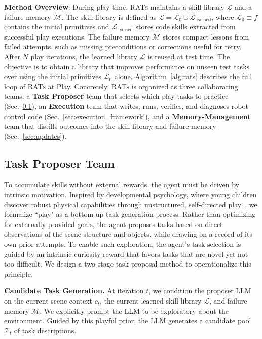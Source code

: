 \documentclass{llmxive}
\begin{document}
\textbf{Method Overview}: During play-time, \textsc{RATs} maintains a skill library $\mathcal{L}$ and a failure memory $\mathcal{M}$. The skill library is defined as
$\mathcal{L} = \mathcal{L}_0 \cup \mathcal{L}_{\text{learned}}$, where $\mathcal{L}_0 \equiv f$ contains the initial primitives and $\mathcal{L}_{\text{learned}}$ stores code skills extracted from successful play executions. The failure memory $\mathcal{M}$ stores compact lessons from failed attempts, such as missing preconditions or corrections useful for retry.
After $N$ play iterations, the learned library $\mathcal{L}$ is reused at test time. The objective is to obtain a library that improves performance on unseen test tasks over using the initial primitives $\mathcal{L}_0$ alone.
Algorithm~\ref{alg:rats} describes the full loop of \textsc{RATs} at Play.
Concretely, \textsc{RATs} is organized as three collaborating teams: a \textbf{Task Proposer} team that selects which play tasks to practice (Sec.~\ref{sec:proposer}), an \textbf{Execution} team that writes, runs, verifies, and diagnoses robot-control code (Sec.~\ref{sec:execution_framework}), and a \textbf{Memory-Management} team that distills outcomes into the skill library and failure memory (Sec.~\ref{sec:updates}).








\subsection{Task Proposer Team}
\label{sec:proposer}
To accumulate skills without external rewards, the agent must be driven by intrinsic motivation.
Inspired by developmental psychology, where young children discover robust physical capabilities through unstructured, self-directed play~\cite{oudeyer2007intrinsic}, we formalize ``play" as a bottom-up task-generation process.
Rather than optimizing for externally provided goals, the agent proposes tasks based on direct observations of the scene structure and objects, while drawing on a record of its own prior attempts.
To enable such exploration, the agent's task selection is guided by an intrinsic curiosity reward that favors tasks that are novel yet not too difficult. We design a two-stage task-proposal method to operationalize this principle.

\textbf{Candidate Task Generation.} 
At iteration $t$, we condition the proposer LLM on the current scene context $c_t$, the current learned skill library $\mathcal{L}$, and failure memory $\mathcal{M}$. 
We explicitly prompt the LLM to be exploratory about the environment.
Guided by this playful prior, the LLM generates a candidate pool $\mathcal{T}_t$ of task descriptions.
\end{document}
